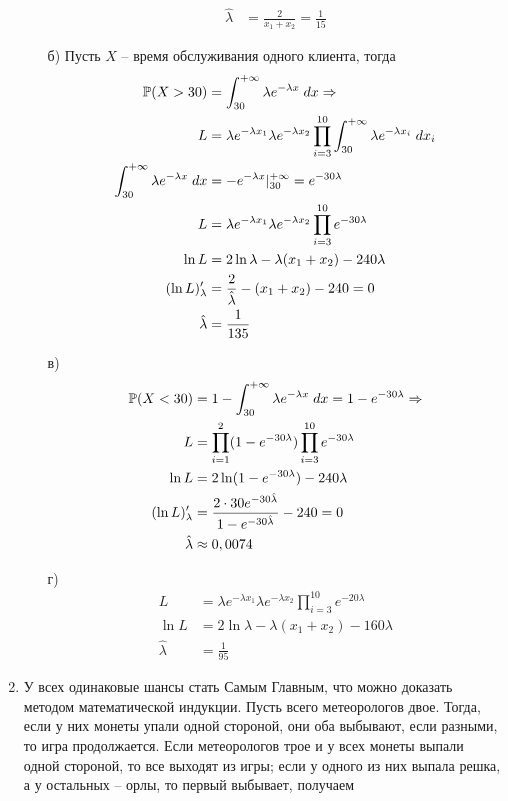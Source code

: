 \begin{enumerate}
\begin{enumerate}
\begin{align*}
\hat{\lambda}&=\frac{2}{x_1+x_2}=\frac{1}{15}
\end{align*}
\item[б)] Пусть $X$ – время обслуживания одного клиента, тогда
\begin{align*}
\P(X>30)&=\int^{+\infty}_{30}\lambda e^{-\lambda x} \; dx \Rightarrow\\
L&=\lambda e^{-\lambda x_1}\lambda e^{-\lambda x_2}\prod^{10}_{i=3}\int^{+\infty}_{30}\lambda e^{-\lambda x_i} \; dx_i\\
\int^{+\infty}_{30}\lambda e^{-\lambda x} \; dx&=-e^{-\lambda x}|^{+\infty}_{30}=e^{-30\lambda}\\
L&=\lambda e^{-\lambda x_1}\lambda e^{-\lambda x_2}\prod^{10}_{i=3}e^{-30\lambda}\\
\ln L&=2\ln \lambda-\lambda(x_1+x_2)-240\lambda\\
(\ln L)'_\lambda&=\frac{2}{\hat{\lambda}}-(x_1+x_2)-240=0\\
\hat{\lambda}&=\frac{1}{135}
\end{align*}
\item[в)]
\begin{align*}
\P(X<30)&=1-\int^{+\infty}_{30}\lambda e^{-\lambda x} \; dx=1-e^{-30\lambda} \Rightarrow\\
L&=\prod^{2}_{i=1}(1-e^{-30\lambda})\prod^{10}_{i=3}e^{-30\lambda}\\
\ln L&=2\ln (1-e^{-30\lambda})-240\lambda\\
(\ln L)'_\lambda&=\frac{2\cdot30e^{-30\hat{\lambda}}}{1-e^{-30\hat{\lambda}}}-240=0\\
\hat{\lambda}&\approx0,0074
\end{align*}
\item[г)]
\begin{align*}
L&=\lambda e^{-\lambda x_1}\lambda e^{-\lambda x_2}\prod^{10}_{i=3}e^{-20\lambda}\\
\ln L&=2\ln \lambda-\lambda(x_1+x_2)-160\lambda\\
\hat{\lambda}&=\frac{1}{95}
\end{align*}
\end{enumerate}
\item У всех одинаковые шансы стать Самым Главным, что можно доказать методом
математической индукции. Пусть всего метеорологов двое. Тогда, если у них монеты
упали одной стороной, они оба выбывают, если разными, то игра продолжается. Если
метеорологов трое и у всех монеты выпали одной стороной, то все выходят из игры;
если у одного из них выпала решка, а у остальных – орлы, то первый выбывает, получаем

\end{enumerate}
